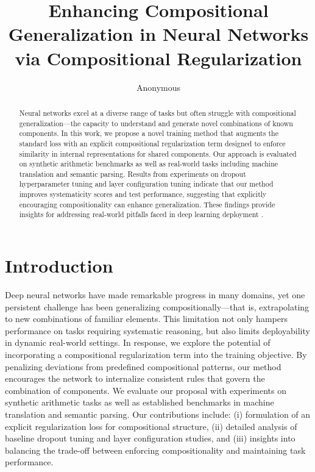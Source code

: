\documentclass{article} %
\title{
Enhancing Compositional Generalization in Neural Networks\\ via Compositional Regularization
}
\author{Anonymous}
\theoremstyle{plain}
\theoremstyle{definition}
\theoremstyle{remark}
\begin{document}
\maketitle

\begin{abstract}
Neural networks excel at a diverse range of tasks but often struggle with compositional generalization—the capacity to understand and generate novel combinations of known components. In this work, we propose a novel training method that augments the standard loss with an explicit compositional regularization term designed to enforce similarity in internal representations for shared components. Our approach is evaluated on synthetic arithmetic benchmarks as well as real-world tasks including machine translation and semantic parsing. Results from experiments on dropout hyperparameter tuning and layer configuration tuning indicate that our method improves systematicity scores and test performance, suggesting that explicitly encouraging compositionality can enhance generalization. These findings provide insights for addressing real-world pitfalls faced in deep learning deployment \citep{goodfellow2016deep}.
\end{abstract}

\section{Introduction}
Deep neural networks have made remarkable progress in many domains, yet one persistent challenge has been generalizing compositionally---that is, extrapolating to new combinations of familiar elements. This limitation not only hampers performance on tasks requiring systematic reasoning, but also limits deployability in dynamic real-world settings. In response, we explore the potential of incorporating a compositional regularization term into the training objective. By penalizing deviations from predefined compositional patterns, our method encourages the network to internalize consistent rules that govern the combination of components. We evaluate our proposal with experiments on synthetic arithmetic tasks as well as established benchmarks in machine translation and semantic parsing. Our contributions include: (i) formulation of an explicit regularization loss for compositional structure, (ii) detailed analysis of baseline dropout tuning and layer configuration studies, and (iii) insights into balancing the trade-off between enforcing compositionality and maintaining task performance.
\end{document}
